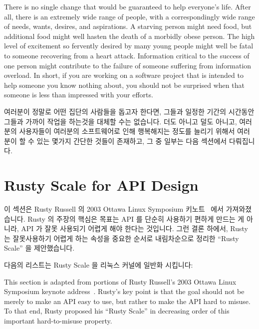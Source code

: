 There is no single change that would be guaranteed to help everyone's life.
After all, there is an extremely wide range of people, with a correspondingly
wide range of needs, wants, desires, and aspirations.
A starving person might need food, but additional food might well hasten
the death of a morbidly obese person.
The high level of excitement so fervently desired by many young people
might well be fatal to someone recovering from a heart attack.
Information critical to the success of one person might contribute to
the failure of someone suffering from information overload.
In short, if you are working on a software project that is intended to
help someone you know nothing about, you should not be surprised when
that someone is less than impressed with your efforts.
\fi

여러분이 정말로 어떤 집단의 사람들을 돕고자 한다면, 그들과 일정한 기간의
시간동안 그들과 가까이 작업을 하는것을 대체할 수는 없습니다.
더도 아니고 덜도 아니고, 여러분의 사용자들이 여러분의 소프트웨어로 인해
행복해지는 정도를 늘리기 위해서 여러분이 할 수 있는 몇가지 간단한 것들이
존재하고, 그 중 일부는 다음 섹션에서 다뤄집니다.

\section{Rusty Scale for API Design}
\label{sec:easy:Rusty Scale for API Design}


이 섹션은 Rusty Russell 의 2003 Ottawa Linux Symposium 키노트~\cite[Slides
39-57]{RustyRussell2003OLSkeynote} 에서 가져와졌습니다.
Rusty 의 주장의 핵심은 목표는 API 를 단순히 사용하기 편하게 만드는 게 아니라,
API 가 잘못 사용되기 어렵게 해야 한다는 것입니다.
그런 결론 하에서, Rusty 는 잘못사용하기 어렵게 하는 속성을 중요한 순서로
내림차순으로 정리한 ``Rusty Scale'' 을 제안했습니다.

다음의 리스트는 Rusty Scale 을 리눅스 커널에 일반화 시킵니다:
\iffalse

This section is adapted from portions of Rusty Russell's 2003 Ottawa Linux
Symposium keynote address~\cite[Slides 39-57]{RustyRussell2003OLSkeynote}.
Rusty's key point is that the goal should not be merely to make an API
easy to use, but rather to make the API hard to misuse.
To that end, Rusty proposed his ``Rusty Scale'' in decreasing order
of this important hard-to-misuse property.

